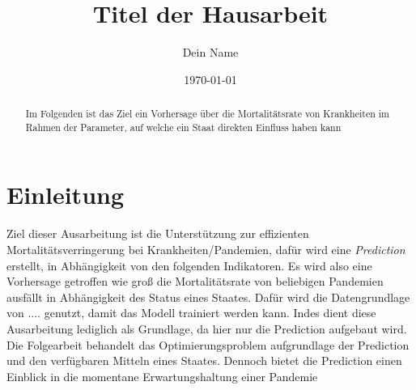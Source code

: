 \documentclass[a4paper,12pt]{article}
\title{Titel der Hausarbeit}
\author{Dein Name}
\date{\today}
\begin{document}
\maketitle

\begin{abstract}
Im Folgenden ist das Ziel ein Vorhersage über die Mortalitätsrate von Krankheiten im Rahmen der Parameter, auf welche
    ein Staat direkten Einfluss haben kann

\end{abstract}

\tableofcontents %

\newpage

\section{Einleitung}
Ziel dieser Ausarbeitung ist die Unterstützung zur effizienten Mortalitätsverringerung bei Krankheiten/Pandemien, dafür
wird eine \textit{Prediction} erstellt, in Abhängigkeit von den folgenden Indikatoren.\newline
Es wird also eine Vorhersage getroffen wie groß die Mortalitätsrate von beliebigen Pandemien ausfällt in Abhängigkeit des
Status eines Staates. Dafür wird die Datengrundlage von .... genutzt, damit das Modell trainiert werden kann.
Indes dient diese Ausarbeitung lediglich als Grundlage, da hier nur die Prediction aufgebaut wird. Die Folgearbeit
behandelt das Optimierungsproblem aufgrundlage der Prediction und den verfügbaren Mitteln eines Staates.\newline
Dennoch bietet die Prediction einen Einblick in die momentane Erwartungshaltung einer Pandemie
\end{document}
